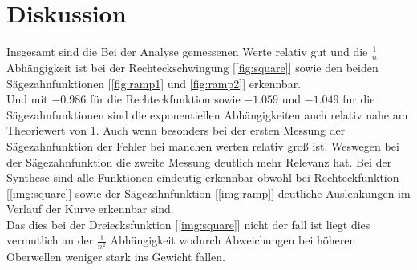 \section{Diskussion}
\label{sec:Diskussion}
Insgesamt sind die Bei der Analyse gemessenen Werte relativ gut und die $\frac{1}{n}$ Abhängigkeit ist bei der Rechteckschwingung [\autoref{fig:square}] sowie den beiden Sägezahnfunktionen [\autoref{fig:ramp1} und \autoref{fig:ramp2}] erkennbar.\\
Und mit $−0.986$ für die Rechteckfunktion sowie $-1.059$ und $-1.049$ fur die Sägezahnfunktionen sind die exponentiellen Abhängigkeiten auch relativ nahe am Theoriewert von 1.
Auch wenn besonders bei der ersten Messung der Sägezahnfunktion der Fehler bei manchen werten relativ groß ist. Weswegen bei der Sägezahnfunktion die zweite Messung deutlich mehr Relevanz hat.
Bei der Synthese sind alle Funktionen eindeutig erkennbar obwohl bei Rechteckfunktion [\autoref{img:square}] sowie der Sägezahnfunktion [\autoref{img:ramp}] deutliche Auslenkungen im Verlauf der Kurve erkennbar sind.\\
Das dies bei der Dreiecksfunktion [\autoref{img:square}] nicht der fall ist liegt dies vermutlich an der $\frac{1}{n^2}$ Abhängigkeit wodurch Abweichungen bei höheren Oberwellen weniger stark ins Gewicht fallen.